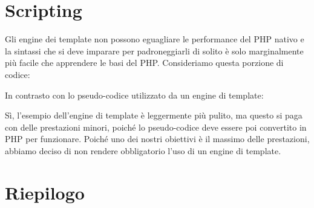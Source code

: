 \section{Scripting}
\label{cap:script}

Gli engine dei template non possono eguagliare le performance del \ac{PHP} nativo e la sintassi che si deve imparare per padroneggiarli di solito è solo marginalmente più facile che apprendere le basi del \ac{PHP}. Consideriamo questa porzione di codice:


In contrasto con lo pseudo-codice utilizzato da un engine di template:


Sì, l'esempio dell'engine di template è leggermente più pulito, ma questo si paga con delle prestazioni minori, poiché lo pseudo-codice deve essere poi convertito in \ac{PHP} per funzionare. Poiché uno dei nostri obiettivi è il massimo delle prestazioni, abbiamo deciso di non rendere obbligatorio l'uso di un engine di template.

\section{Riepilogo}
\omissis